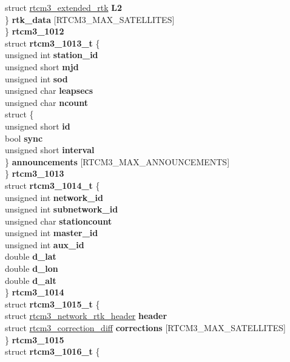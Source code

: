 \begin{DoxyCompactItemize}
{\begin{tabbing}
\>\>\>struct \hyperlink{structrtcm3__extended__rtk}{rtcm3\_extended\_rtk} {\bfseries L2}\\
\>\>\} {\bfseries rtk\_data} \mbox{[}RTCM3\_MAX\_SATELLITES\mbox{]}\\
\>\} {\bfseries rtcm3\_1012}\\
\>struct {\bfseries rtcm3\_1013\_t} \{\\
\>\>unsigned int {\bfseries station\_id}\\
\>\>unsigned short {\bfseries mjd}\\
\>\>unsigned int {\bfseries sod}\\
\>\>unsigned char {\bfseries leapsecs}\\
\>\>unsigned char {\bfseries ncount}\\
\>\>struct \{\\
\>\>\>unsigned short {\bfseries id}\\
\>\>\>bool {\bfseries sync}\\
\>\>\>unsigned short {\bfseries interval}\\
\>\>\} {\bfseries announcements} \mbox{[}RTCM3\_MAX\_ANNOUNCEMENTS\mbox{]}\\
\>\} {\bfseries rtcm3\_1013}\\
\>struct {\bfseries rtcm3\_1014\_t} \{\\
\>\>unsigned int {\bfseries network\_id}\\
\>\>unsigned int {\bfseries subnetwork\_id}\\
\>\>unsigned char {\bfseries stationcount}\\
\>\>unsigned int {\bfseries master\_id}\\
\>\>unsigned int {\bfseries aux\_id}\\
\>\>double {\bfseries d\_lat}\\
\>\>double {\bfseries d\_lon}\\
\>\>double {\bfseries d\_alt}\\
\>\} {\bfseries rtcm3\_1014}\\
\>struct {\bfseries rtcm3\_1015\_t} \{\\
\>\>struct \hyperlink{structrtcm3__network__rtk__header}{rtcm3\_network\_rtk\_header} {\bfseries header}\\
\>\>struct \hyperlink{structrtcm3__correction__diff}{rtcm3\_correction\_diff} {\bfseries corrections} \mbox{[}RTCM3\_MAX\_SATELLITES\mbox{]}\\
\>\} {\bfseries rtcm3\_1015}\\
\>struct {\bfseries rtcm3\_1016\_t} \{\\

\end{tabbing}}
\end{DoxyCompactItemize}

